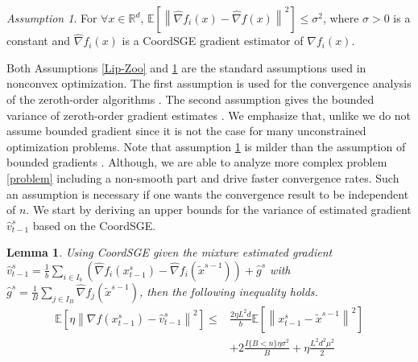 \documentclass{article}
\newcommand*{\R}{\mathbb{R}}
\newcommand*{\E}{\mathbb{E}}
\newcommand{\norm}[1]{\left\lVert#1\right\rVert}
\newtheorem{lemma}[theorem]{Lemma}
\theoremstyle{definition}
\theoremstyle{remark}
\newtheorem{assumption}[theorem]{Assumption}
\begin{document}
\begin{assumption}\label{Var-Zoo}
For $\forall x\in\R^d$, $\E\left[\norm{\hat{\nabla} f_i(x) - \hat{\nabla} f(x)}^2\right] \leq \sigma^2$, where $\sigma > 0$ is a constant and $\hat{\nabla} f_i(x)$ is a CoordSGE gradient estimator of $\nabla f_i(x)$.
\end{assumption}
{\color{Green}
{\color{Brown}
Both Assumptions \ref{Lip-Zoo} and \ref{Var-Zoo} are the standard assumptions used in nonconvex optimization.}
The first assumption is used for the convergence analysis of the zeroth-order algorithms \cite{ghadimi2016accelerated,nesterov2017random,
liu2018zeroth}.} {\color{Green} The second assumption gives the bounded variance of zeroth-order gradient estimates \cite{lian2016comprehensive,liu2018stochastic,
liu2018zeroth,hajinezhad2017zeroth}. {\color{Brown}
We emphasize that, unlike \cite{duchi2015optimal,ghadimi2013stochastic,huang2019faster}  we do not assume  bounded gradient since it is not the case for many unconstrained optimization problems. Note that assumption \ref{Var-Zoo} is milder than the assumption of bounded gradients \cite{liu2017zeroth,hajinezhad2017zeroth}.}
{\color{Green}Although, we are able to analyze more complex problem \eqref{problem} including a non-smooth part and drive faster convergence rates.} {\color{Violet}Such an assumption is necessary if one wants the convergence result to be independent of $n$.
}
{\color{Green}
We start by deriving an upper bounds for the variance of estimated gradient $\hat{v}_{t-1}^s$ based on the CoordSGE.}
}
\begin{lemma}\label{var-estimate-lem}
Using CoordSGE given the mixture estimated gradient $\hat{v}_{t-1}^s = \frac{1}{b} \sum_{i\in I_b}\left(\hat{\nabla} f_{i}(x_{t-1}^s)-\hat{\nabla} f_{i}(\tilde{x}^{s-1})\right)+\hat{g}^s$ with $\hat{g}^s = \frac{1}{B} \sum_{j\in I_B} \hat{\nabla} f_j (\tilde{x}^{s-1})$, then the following inequality holds. 
\begin{equation}
\begin{split}
\E\left[\eta\norm{\nabla f(x_{t-1}^s)-{\hat{v}_{t-1}^s}}^2\right] \leq&  \frac{2\eta L^2 d}{b}\E\left[\norm{x_{t-1}^s-\tilde{x}^{s-1}}^2\right]\\
&+ 2\frac{I\{B < n\}\eta \sigma ^2}{B}+\eta \frac{L^2 d^2 \mu^2}{2}
\end{split}
\end{equation}
\end{lemma}
\end{document}
